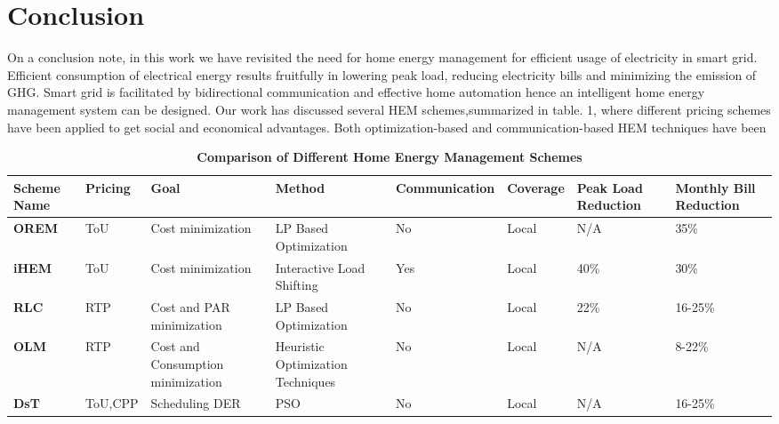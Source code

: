 \documentclass[journal]{IEEEtran}
\begin{document}
\section{Conclusion}
On a conclusion note, in this work we have revisited the need for home energy management for efficient usage of electricity in smart grid. Efficient consumption of electrical energy results fruitfully in lowering peak load, reducing electricity bills and minimizing the emission of GHG. Smart grid is facilitated by bidirectional communication and effective home automation hence an intelligent home energy management system can be designed. Our work has discussed several HEM schemes,summarized in table. 1, where different pricing schemes have been applied to get social and economical advantages. Both optimization-based and communication-based HEM techniques have been

\begin{table*}[t]
\centering
\caption{\bf Comparison of Different Home Energy Management Schemes}
\begin{tabular}{|m{1.5cm}|m{1cm}|m{1.7cm}|m{1.5cm}|m{1.6cm}|m{1.2cm}|m{1.3cm}|m{1.3cm}|}
\hline
\textbf{Scheme Name} & Pricing & Goal &  Method & Communication & Coverage & Peak Load Reduction & Monthly Bill Reduction \\
\hline
\textbf{OREM} & {ToU} & Cost minimization & LP Based Optimization & No & Local & N/A & 35\% \\
\hline
\textbf{iHEM} & {ToU} & Cost minimization & Interactive Load Shifting & Yes & Local & 40\% & 30\% \\
\hline
\textbf{RLC} & {RTP} & Cost and PAR minimization & LP Based Optimization & No & Local & 22\% & 16-25\% \\
\hline
\textbf{OLM} & {RTP} & Cost and Consumption minimization & Heuristic Optimization Techniques & No & Local  & N/A & 8-22\% \\
\hline
\textbf{DsT} & {ToU,CPP} & Scheduling DER & PSO & No & Local & N/A & 16-25\% \\
\hline

\end{tabular}
\label{tab:template}
\end{table*}
\end{document}
